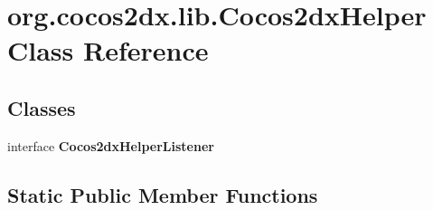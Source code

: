 \hypertarget{classorg_1_1cocos2dx_1_1lib_1_1Cocos2dxHelper}{}\section{org.\+cocos2dx.\+lib.\+Cocos2dx\+Helper Class Reference}
\label{classorg_1_1cocos2dx_1_1lib_1_1Cocos2dxHelper}
\subsection*{Classes}
\begin{DoxyCompactItemize}
\item 
interface {\bfseries Cocos2dx\+Helper\+Listener}
\end{DoxyCompactItemize}
\subsection*{Static Public Member Functions}
